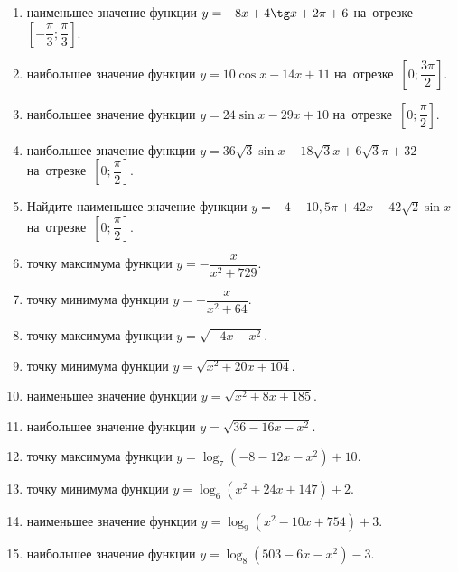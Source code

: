 \documentclass[a4paper,10pt]{article}
\begin{document}
\begin{enumerate}
\item {} наименьшее значение функции $y=-8x +4\tg x+2\pi+6$ на~отрезке~$\left[-\dfrac{\pi}{3};\dfrac{\pi}{3}\right]$.

\item {} наибольшее значение функции $y=10\cos x-14x+11$ на~отрезке~$\left[0;\dfrac{3\pi}{2}\right]$.

\item {} наибольшее значение функции $y=24\sin x-29x+10$ на~отрезке~$\left[0;\dfrac{\pi}{2}\right]$.

\item {} наибольшее значение функции $y=36\sqrt{3}\sin x-18\sqrt{3}x+6\sqrt{3}\pi +32$ на~отрезке~$\left[0;\dfrac{\pi}{2}\right]$.

\item Найдите наименьшее значение функции $y=-4-10,5\pi+42x-42\sqrt{2}\sin x$ на~отрезке~$\left[0;\dfrac{\pi}{2}\right]$.

\item {} точку максимума функции $y=-\dfrac{x}{ x^2 +729}$.

\item {} точку минимума функции $y=-\dfrac{x}{ x^2 +64}$.

\item {} точку максимума функции $y=\sqrt{-4x-x^2}$.

\item {} точку минимума функции $y=\sqrt{x^2+20x+104}$.

\item {} наименьшее значение функции $y=\sqrt{x^2+8x+185}$.

\item {} наибольшее значение функции $y=\sqrt{36-16x-x^2}$.

\item {} точку максимума функции $y=\log_7\left(-8-12x-x^2\right)+10$.

\item {} точку минимума функции $y=\log_6\left(x^2+24x+147\right)+2$.

\item {} наименьшее значение функции $y=\log_9\left(x^2-10x+754\right)+3$.

\item {} наибольшее значение функции $y=\log_8\left(503-6x-x^2\right)-3$.


\end{enumerate}
\end{document}
